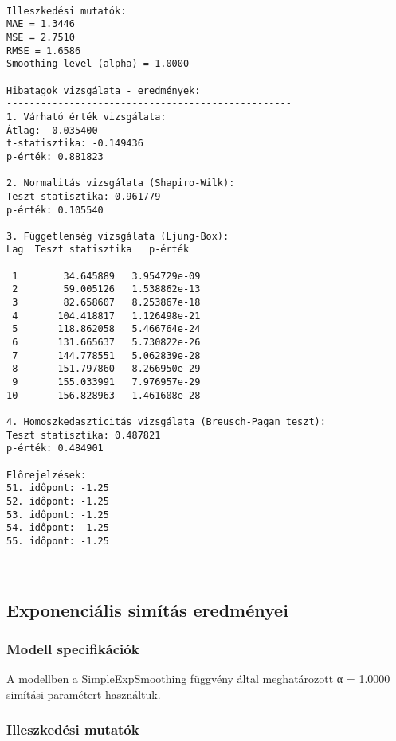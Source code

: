 \documentclass[11pt]{article}
\begin{document}
    \begin{Verbatim}[commandchars=\\\{\}]

Illeszkedési mutatók:
MAE = 1.3446
MSE = 2.7510
RMSE = 1.6586
Smoothing level (alpha) = 1.0000

Hibatagok vizsgálata - eredmények:
--------------------------------------------------
1. Várható érték vizsgálata:
Átlag: -0.035400
t-statisztika: -0.149436
p-érték: 0.881823

2. Normalitás vizsgálata (Shapiro-Wilk):
Teszt statisztika: 0.961779
p-érték: 0.105540

3. Függetlenség vizsgálata (Ljung-Box):
Lag  Teszt statisztika   p-érték
-----------------------------------
 1        34.645889   3.954729e-09
 2        59.005126   1.538862e-13
 3        82.658607   8.253867e-18
 4       104.418817   1.126498e-21
 5       118.862058   5.466764e-24
 6       131.665637   5.730822e-26
 7       144.778551   5.062839e-28
 8       151.797860   8.266950e-29
 9       155.033991   7.976957e-29
10       156.828963   1.461608e-28

4. Homoszkedaszticitás vizsgálata (Breusch-Pagan teszt):
Teszt statisztika: 0.487821
p-érték: 0.484901

Előrejelzések:
51. időpont: -1.25
52. időpont: -1.25
53. időpont: -1.25
54. időpont: -1.25
55. időpont: -1.25
    \end{Verbatim}

    \begin{center}
    \end{center}
    { \hspace*{\fill} \\}
    
    \subsection{Exponenciális simítás
eredményei}\label{exponenciuxe1lis-simuxedtuxe1s-eredmuxe9nyei}

\subsubsection{Modell specifikációk}\label{modell-specifikuxe1ciuxf3k}

A modellben a SimpleExpSmoothing függvény által meghatározott α = 1.0000
simítási paramétert használtuk.

\subsubsection{Illeszkedési mutatók}\label{illeszkeduxe9si-mutatuxf3k}
\end{document}
